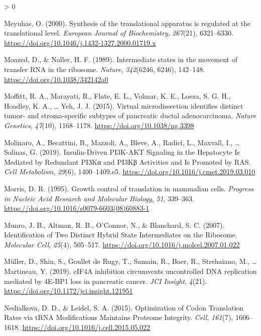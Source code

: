 \documentclass[
  12pt,
  openany]{book}
\newlength{\cslhangindent}
\newenvironment{CSLReferences}[2] %
 {%
  \setlength{\parindent}{0pt}
  \ifodd #1 \everypar{\setlength{\hangindent}{\cslhangindent}}\ignorespaces\fi
  \ifnum #2 > 0
  \setlength{\parskip}{#2\baselineskip}
  \fi
 }%
 {}
\begin{document}
\begin{CSLReferences}{1}{0}
\leavevmode\hypertarget{ref-Meyuhas2000}{}%
Meyuhas, O. (2000). Synthesis of the translational apparatus is regulated at the translational level. \emph{European Journal of Biochemistry}, \emph{267}(21), 6321--6330. \url{https://doi.org/10.1046/j.1432-1327.2000.01719.x}

\leavevmode\hypertarget{ref-Moazed1989}{}%
Moazed, D., \& Noller, H. F. (1989). Intermediate states in the movement of transfer {RNA} in the ribosome. \emph{Nature}, \emph{342}(6246, 6246), 142--148. \url{https://doi.org/10.1038/342142a0}

\leavevmode\hypertarget{ref-Moffitt2015}{}%
Moffitt, R. A., Marayati, R., Flate, E. L., Volmar, K. E., Loeza, S. G. H., Hoadley, K. A., \ldots{} Yeh, J. J. (2015). Virtual microdissection identifies distinct tumor- and stroma-specific subtypes of pancreatic ductal adenocarcinoma. \emph{Nature Genetics}, \emph{47}(10), 1168--1178. \url{https://doi.org/10.1038/ng.3398}

\leavevmode\hypertarget{ref-Molinaro2019}{}%
Molinaro, A., Becattini, B., Mazzoli, A., Bleve, A., Radici, L., Maxvall, I., \ldots{} Solinas, G. (2019). Insulin-{Driven PI3K}-{AKT Signaling} in the {Hepatocyte Is Mediated} by {Redundant PI3Kα} and {PI3Kβ Activities} and {Is Promoted} by {RAS}. \emph{Cell Metabolism}, \emph{29}(6), 1400--1409.e5. \url{https://doi.org/10.1016/j.cmet.2019.03.010}

\leavevmode\hypertarget{ref-Morris1995}{}%
Morris, D. R. (1995). Growth control of translation in mammalian cells. \emph{Progress in Nucleic Acid Research and Molecular Biology}, \emph{51}, 339--363. \url{https://doi.org/10.1016/s0079-6603(08)60883-1}

\leavevmode\hypertarget{ref-Munro2007}{}%
Munro, J. B., Altman, R. B., O'Connor, N., \& Blanchard, S. C. (2007). Identification of {Two Distinct Hybrid State Intermediates} on the {Ribosome}. \emph{Molecular Cell}, \emph{25}(4), 505--517. \url{https://doi.org/10.1016/j.molcel.2007.01.022}

\leavevmode\hypertarget{ref-Muller2019}{}%
Müller, D., Shin, S., Goullet de Rugy, T., Samain, R., Baer, R., Strehaiano, M., \ldots{} Martineau, Y. (2019). {eIF4A} inhibition circumvents uncontrolled {DNA} replication mediated by {4E}-{BP1} loss in pancreatic cancer. \emph{JCI Insight}, \emph{4}(21). \url{https://doi.org/10.1172/jci.insight.121951}

\leavevmode\hypertarget{ref-Nedialkova2015}{}%
Nedialkova, D. D., \& Leidel, S. A. (2015). Optimization of {Codon Translation Rates} via {tRNA Modifications Maintains Proteome Integrity}. \emph{Cell}, \emph{161}(7), 1606--1618. \url{https://doi.org/10.1016/j.cell.2015.05.022}


\end{CSLReferences}
\end{document}
